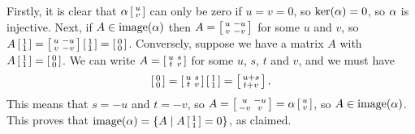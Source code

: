  Firstly, it is clear that $\al\bsm u\\ v\esm$ can only be
 zero if $u=v=0$, so $\ker(\al)=0$, so $\al$ is injective.
 Next, if $A\in\img(\al)$ then $A=\bsm u& -u\\ v&-v\esm$ for
 some $u$ and $v$, so
 $A\bsm 1\\1\esm=\bsm u&-u\\ v&-v\esm\bsm 1\\1\esm =
 \bsm 0\\0\esm$.  Conversely, suppose we have a matrix
 $A$ with $A\bsm 1\\1\esm=\bsm 0\\0\esm$.  We can write
 $A=\bsm u&s\\ t&v\esm$ for some $u$, $s$, $t$ and $v$, and
 we must have
 \[ \bsm 0\\0 \esm = \bsm u&s\\ t&v\esm \bsm 1\\1\esm =
     \bsm u+s\\ t+v\esm.
 \]
 This means that $s=-u$ and $t=-v$, so
 $A=\bsm u&-u\\ -v&v\esm=\al\bsm u\\ v\esm$, so
 $A\in\img(\al)$.  This proves that
 $\img(\al)=\{A\st A\bsm 1\\1\esm=0\}$, as claimed.
\EndDeferredSolution


